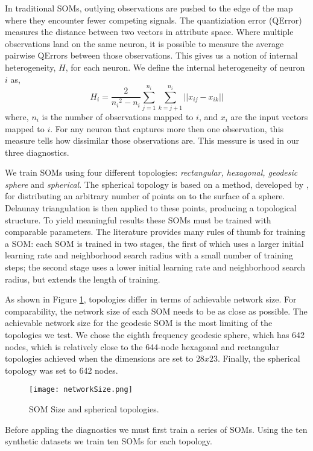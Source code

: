 In traditional SOMs, outlying observations are pushed to the edge of the map
where they encounter fewer competing signals.
The quantiziation error (QError) measures the distance between two vectors in attribute space. 
Where multiple observations land on the same neuron, it is possible to measure
the average pairwise QErrors between those observations.  This gives us a
notion of internal heterogeneity, \(H\), for each neuron.  We define the
internal heterogeneity of neuron \(i\) as,
 \begin{equation}
   {H_i} = \frac{2}{{n_i}^2-{n_i}}\sum_{j=1}^{n_i}\sum_{k=j+1}^{n_i} ||{x_{ij}}-{x_{ik}}||
 \label{eqno1}
 \end{equation}
where, \(n_i\) is the number of observations mapped to \(i\), and \(x_i\) are
the input vectors mapped to \(i\).  For any neuron that captures more then one
observation, this measure tells how dissimilar those observations are.  This
messure is used in our three diagnostics.

We train SOMs using four different topologies:
\emph{rectangular, hexagonal, geodesic sphere} and \emph{spherical}.  The spherical
topology is based on a method, developed by \cite{Rakhmanov94}, for
distributing an arbitrary number of points on to the surface of a sphere.
Delaunay triangulation is then applied to these points, producing a
topological structure.  To yield meaningful results these SOMs must be trained
with comparable parameters.  The literature provides many rules of thumb for
training a SOM: each SOM is trained in two stages, the first of which uses a larger
initial learning rate and neighborhood search radius with a small number of
training steps; the second stage uses a lower initial learning rate and
neighborhood search radius, but extends the length of training.

As shown in Figure \ref{fig:nSize}, topologies differ in terms of achievable
network size.  For comparability, the network size of each SOM needs to be as
close as possible.  The achievable network size for the geodesic SOM is the
most limiting of the topologies we test. We chose the eighth frequency
geodesic sphere, which has 642 nodes, which is relatively close to the
644-node hexagonal and rectangular topologies achieved when the dimensions are
set to \(28x23\). Finally, the spherical topology was set to 642 nodes.

\begin{figure}[htb]
  \begin{center}
\caption{SOM Size and spherical topologies.}
\label{fig:nSize}
\texttt{[image: networkSize.png]}
\end{center}
\end{figure}

Before appling the diagnostics we must first train a series of SOMs.  Using the
ten synthetic datasets we train ten SOMs for each topology. 

